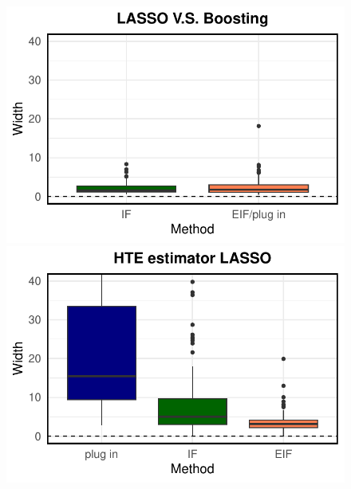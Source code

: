 \begin{figure}[ht]
\begin{minipage}{0.3\textwidth}
                \includegraphics[clip, trim = 0cm 0cm 0cm 0cm, width = \textwidth]{plot/ACIC_nonlinear_propensity_linear_HTE_CI_width_LASSO_V.S._Boosting.pdf}
        \end{minipage}        
        \begin{minipage}{0.3\textwidth}
                \centering
                \includegraphics[clip, trim = 0cm 0cm 0cm 0cm, width = \textwidth]{plot/ACIC_nonlinear_propensity_nonlinear_HTE_CI_width_LASSO.pdf}
        \end{minipage}
        \begin{minipage}{0.3\textwidth}
                \centering

\end{minipage}
\end{figure}
